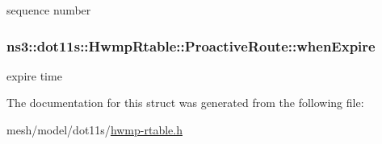 sequence number 

\subsubsection[{\texorpdfstring{when\+Expire}{whenExpire}}]{ ns3\+::dot11s\+::\+Hwmp\+Rtable\+::\+Proactive\+Route\+::when\+Expire}\hypertarget{structns3_1_1dot11s_1_1HwmpRtable_1_1ProactiveRoute_aba399b6191c1c8998b0d1a2013f3bbc6}{}\label{structns3_1_1dot11s_1_1HwmpRtable_1_1ProactiveRoute_aba399b6191c1c8998b0d1a2013f3bbc6}


expire time 



The documentation for this struct was generated from the following file\+:\begin{DoxyCompactItemize}
\item 
mesh/model/dot11s/\hyperlink{hwmp-rtable_8h}{hwmp-\/rtable.\+h}\end{DoxyCompactItemize}
